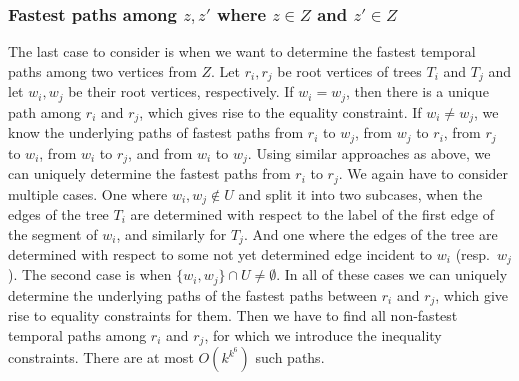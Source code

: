 \documentclass[11pt,a4paper]{article}
\theoremstyle{remark}
\theoremstyle{definition}
\begin{document}
\subsubsection*{\boldmath Fastest paths among $z,z'$ where $z \in Z$ and $z' \in Z$}
The last case to consider is when we want to determine the fastest temporal paths among two vertices from $Z$.
Let $r_i, r_j$ be root vertices of trees $T_i$ and $T_j$ and let $w_i, w_j$ be their root vertices, respectively.
If $w_i = w_j$, then there is a unique path among $r_i$ and $r_j$, which gives rise to the equality constraint.
If $w_i \neq w_j$, we know the underlying paths of fastest paths 
from $r_i$ to $w_j$, from $w_j$ to $r_i$,
from $r_j$ to $w_i$, from $w_i$ to $r_j$,
and from $w_i$ to $w_j$.
Using similar approaches as above, we can uniquely determine the fastest paths from $r_i$ to $r_j$.
We again have to consider multiple cases.
One where $w_i,w_j \notin U$ and 
split it into two subcases, when the edges of the tree $T_i$ are determined with respect to the
label of the first edge of the segment of $w_i$, and similarly for $T_j$.
And one where the edges of the tree are determined with respect to some not yet determined edge incident to $w_i$ (resp.~$w_j$).
The second case is when $\{w_i, w_j\} \cap U \neq \emptyset$.
In all of these cases we can uniquely determine the underlying paths of the fastest paths between $r_i$ and $r_j$,
which give rise to equality constraints for them. 
Then we have to find all non-fastest temporal paths among $r_i$ and $r_j$, for which we introduce the inequality constraints. 
There are at most $O(k^{k^6})$ such paths.
\end{document}
